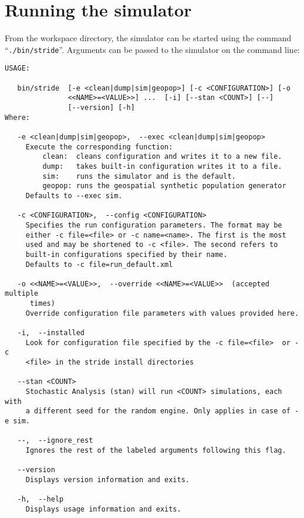 \section{Running the simulator}

From the workspace directory, the simulator can be started  using the command \mbox{``\texttt{./bin/stride}''}. Arguments can be passed to the simulator on the command line:
\begin{verbatim}
USAGE: 
 
   bin/stride  [-e <clean|dump|sim|geopop>] [-c <CONFIGURATION>] [-o
               <<NAME>=<VALUE>>] ...  [-i] [--stan <COUNT>] [--]
               [--version] [-h]
Where: 
 
   -e <clean|dump|sim|geopop>,  --exec <clean|dump|sim|geopop>
     Execute the corresponding function:  
         clean:  cleans configuration and writes it to a new file.  
         dump:   takes built-in configuration writes it to a file.  
         sim:    runs the simulator and is the default.  
         geopop: runs the geospatial synthetic population generator
     Defaults to --exec sim.
 
   -c <CONFIGURATION>,  --config <CONFIGURATION>
     Specifies the run configuration parameters. The format may be 
     either -c file=<file> or -c name=<name>. The first is the most
     used and may be shortened to -c <file>. The second refers to
     built-in configurations specified by their name.
     Defaults to -c file=run_default.xml
 
   -o <<NAME>=<VALUE>>,  --override <<NAME>=<VALUE>>  (accepted multiple
      times)
     Override configuration file parameters with values provided here.
 
   -i,  --installed
     Look for configuration file specified by the -c file=<file>  or -c
     <file> in the stride install directories
 
   --stan <COUNT>
     Stochastic Analysis (stan) will run <COUNT> simulations, each with
     a different seed for the random engine. Only applies in case of -e sim.
 
   --,  --ignore_rest
     Ignores the rest of the labeled arguments following this flag.
 
   --version
     Displays version information and exits.
 
   -h,  --help
     Displays usage information and exits.
\end{verbatim}

